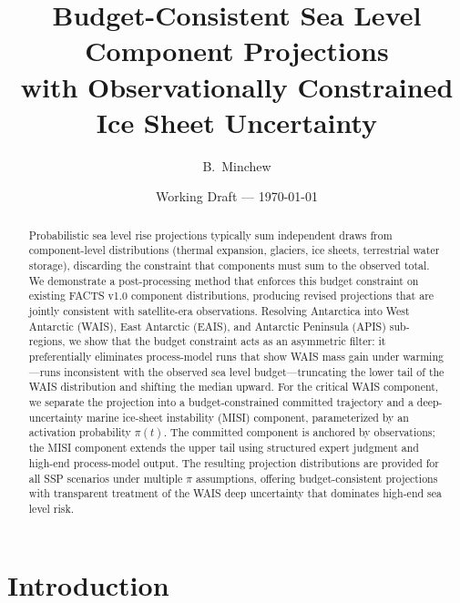 \documentclass[11pt]{article}
\title{Budget-Consistent Sea Level Component Projections\\
  with Observationally Constrained Ice Sheet Uncertainty}
\author{B.\ Minchew}
\date{Working Draft --- \today}
\begin{document}
\maketitle


\begin{abstract}
Probabilistic sea level rise projections typically sum independent draws from component-level distributions (thermal expansion, glaciers, ice sheets, terrestrial water storage), discarding the constraint that components must sum to the observed total.
We demonstrate a post-processing method that enforces this budget constraint on existing FACTS v1.0 component distributions, producing revised projections that are jointly consistent with satellite-era observations.
Resolving Antarctica into West Antarctic (WAIS), East Antarctic (EAIS), and Antarctic Peninsula (APIS) sub-regions, we show that the budget constraint acts as an asymmetric filter: it preferentially eliminates process-model runs that show WAIS mass gain under warming---runs inconsistent with the observed sea level budget---truncating the lower tail of the WAIS distribution and shifting the median upward.
For the critical WAIS component, we separate the projection into a budget-constrained committed trajectory and a deep-uncertainty marine ice-sheet instability (MISI) component, parameterized by an activation probability $\pi(t)$.
The committed component is anchored by observations; the MISI component extends the upper tail using structured expert judgment and high-end process-model output.
The resulting projection distributions are provided for all SSP scenarios under multiple $\pi$ assumptions, offering budget-consistent projections with transparent treatment of the WAIS deep uncertainty that dominates high-end sea level risk.
\end{abstract}


\section{Introduction}
\label{sec:intro}
\end{document}
